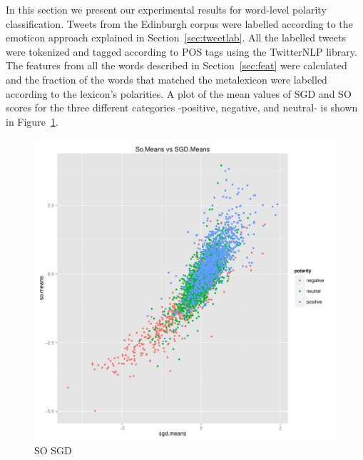 \documentclass{sig-alternate}
\begin{document}
In this section we present our experimental results for word-level polarity classification. Tweets from the Edinburgh corpus were labelled according to the emoticon approach explained in Section~\ref{sec:tweetlab}. All the labelled tweets were tokenized and tagged according to POS tags using the TwitterNLP library. The features from all the words described in Section~\ref{sec:feat} were calculated and the fraction of the words that matched the metalexicon were labelled according to the lexicon's polarities. A plot of the mean values of SGD and SO scores for the three different categories -positive, negative, and neutral- is shown in Figure~\ref{fig:sosgd}.


\begin{figure}[ht]
	\centering
	\includegraphics[scale=0.4]{sosgd.pdf}
	\caption{SO SGD}
	\label{fig:sosgd}
\end{figure}
\end{document}
